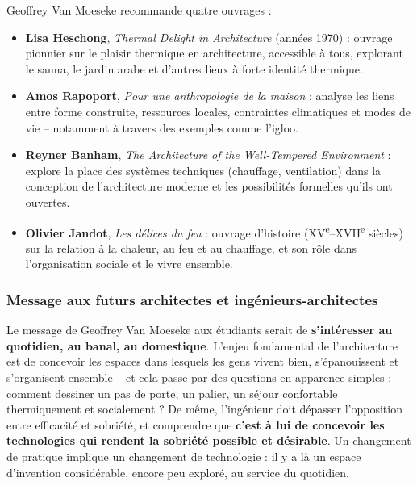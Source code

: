 Geoffrey Van Moeseke recommande quatre ouvrages :

\begin{itemize}
    \item \textbf{Lisa Heschong}, \textit{Thermal Delight in Architecture} (années 1970) : ouvrage pionnier sur le plaisir thermique en architecture, accessible à tous, explorant le sauna, le jardin arabe et d'autres lieux à forte identité thermique.
    \item \textbf{Amos Rapoport}, \textit{Pour une anthropologie de la maison} : analyse les liens entre forme construite, ressources locales, contraintes climatiques et modes de vie -- notamment à travers des exemples comme l'igloo.
    \item \textbf{Reyner Banham}, \textit{The Architecture of the Well-Tempered Environment} : explore la place des systèmes techniques (chauffage, ventilation) dans la conception de l'architecture moderne et les possibilités formelles qu'ils ont ouvertes.
    \item \textbf{Olivier Jandot}, \textit{Les délices du feu} : ouvrage d'histoire (XV\textsuperscript{e}--XVII\textsuperscript{e} siècles) sur la relation à la chaleur, au feu et au chauffage, et son rôle dans l'organisation sociale et le vivre ensemble.
\end{itemize}

\subsubsection{Message aux futurs architectes et ingénieurs-architectes}

Le message de Geoffrey Van Moeseke aux étudiants serait de \textbf{s'intéresser au quotidien, au banal, au domestique}. L'enjeu fondamental de l'architecture est de concevoir les espaces dans lesquels les gens vivent bien, s'épanouissent et s'organisent ensemble -- et cela passe par des questions en apparence simples : comment dessiner un pas de porte, un palier, un séjour confortable thermiquement et socialement ? De même, l'ingénieur doit dépasser l'opposition entre efficacité et sobriété, et comprendre que \textbf{c'est à lui de concevoir les technologies qui rendent la sobriété possible et désirable}. Un changement de pratique implique un changement de technologie : il y a là un espace d'invention considérable, encore peu exploré, au service du quotidien.